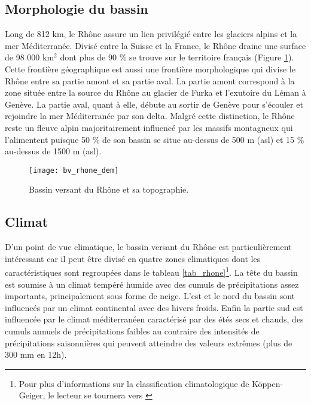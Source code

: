 \subsection*{Morphologie du bassin}

Long de 812 km, le Rhône assure un lien privilégié entre les glaciers alpins et la mer Méditerranée. Divisé entre la Suisse et la France, le Rhône draine une surface de 98 000 km$^{2}$ dont plus de 90 \% se trouve sur le territoire français (Figure \ref{bv_rhone_dem}). Cette frontière géographique est aussi une frontière morphologique qui divise le Rhône entre sa partie amont et sa partie aval. La partie amont correspond à la zone située entre la source du Rhône au glacier de Furka et l'exutoire du Léman à Genève. La partie aval, quant à elle, débute au sortir de Genève pour s'écouler et rejoindre la mer Méditerranée par son delta. Malgré cette distinction, le Rhône reste un fleuve alpin majoritairement influencé par les massifs montagneux qui l'alimentent puisque 50 \% de son bassin se situe au-dessus de 500 m (asl) et 15 \% au-dessus de 1500 m (asl). 

\begin{figure}[h!]
\centering
\texttt{[image: bv\_rhone\_dem]}
\caption{Bassin versant du Rhône et sa topographie.}
\label{bv_rhone_dem}
\end{figure}

\subsection*{Climat}
D'un point de vue climatique, le bassin versant du Rhône est particulièrement intéressant  car il peut être divisé en quatre zones climatiques dont les caractéristiques sont regroupées dans le tableau \ref{tab_rhone}\footnote{Pour plus d'informations sur la classification climatologique de Köppen-Geiger, le lecteur se tournera vers \citep{beck2017}}. La tête du bassin est soumise à un climat tempéré humide avec des cumuls de précipitations assez importants, principalement sous forme de neige. L'est et le nord du bassin sont influencés par un climat continental avec des hivers froids. Enfin la partie sud est influencée par le climat méditerranéen caractérisé par des étés secs et chauds, des cumuls annuels de précipitations faibles au contraire des intensités de précipitations saisonnières qui peuvent atteindre des valeurs extrêmes (plus de 300 mm en 12h).

